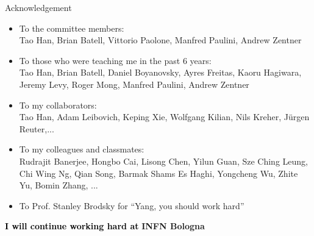 \documentclass[aspectratio=169]{beamer}
\begin{document}
\begin{frame}{Acknowledgement}
\Background
{}
\vspace{-3mm}
\begin{itemize}
	\item To the committee members:\\
	Tao Han, Brian Batell, Vittorio Paolone, Manfred Paulini, Andrew Zentner
	\item To those who were teaching me in the past $6$ years:\\
	Tao Han, Brian Batell, Daniel Boyanovsky, Ayres Freitas, Kaoru Hagiwara, Jeremy Levy, Roger Mong, Manfred Paulini, Andrew Zentner
	\item To my collaborators: \\
	Tao Han, Adam Leibovich, Keping Xie, Wolfgang Kilian, Nils Kreher, Jürgen Reuter,...
	\item To my colleagues and classmates:\\
	Rudrajit Banerjee, Hongbo Cai, Lisong Chen, Yilun Guan, Sze Ching Leung, Chi Wing Ng, Qian Song, Barmak Shams Es Haghi, Yongcheng Wu, Zhite Yu, Bomin Zhang, ...
	\item To Prof. Stanley Brodsky for ``Yang, you should work hard''
\end{itemize}
\textcolor{black}{\bf \Large I will continue working hard at} {\bf \Large \textcolor{INFNBlue1}{IN}\textcolor{INFNBlue2}{F}\textcolor{INFNBlue1}{N} \textcolor{INFNBlue2}{Bologna}}
\end{frame}


\appendix
\end{document}
